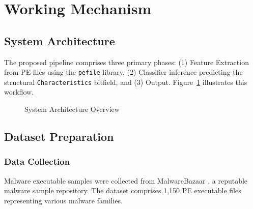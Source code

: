 \documentclass[conference,a4paper]{IEEEtran}
\begin{document}
\section{Working Mechanism}

\subsection{System Architecture}

The proposed pipeline comprises three primary phases: (1) Feature Extraction from PE files using the \texttt{pefile} library, (2) Classifier inference predicting the structural \texttt{Characteristics} bitfield, and (3) Output. Figure~\ref{fig:workflow} illustrates this workflow.

\begin{figure}[!htbp]
\centering
{}
\caption{System Architecture Overview}
\label{fig:workflow}
\end{figure}

\subsection{Dataset Preparation}

\subsubsection{Data Collection}
Malware executable samples were collected from MalwareBazaar \cite{malwarebazaar}, a reputable malware sample repository. The dataset comprises 1,150 PE executable files representing various malware families.
\end{document}
